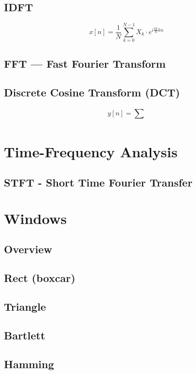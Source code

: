 \subsection{IDFT}
\begin{equation}
    x[n] = \frac{1}{N} \sum_{k=0}^{N-1} X_k\cdot e^{i \frac{2 \pi}{N} k n}
\end{equation}


\subsection{FFT --- Fast Fourier Transform}

\subsection{Discrete Cosine Transform (DCT)}

\begin{equation}
    y[n] = \sum^{}_{}
\end{equation}

\section{Time-Frequency Analysis}
\subsection{STFT - Short Time Fourier Transfer}

\section{Windows}
\subsection{Overview}


\subsection{Rect (boxcar)}
\subsection{Triangle}
\subsection{Bartlett}
\subsection{Hamming}
